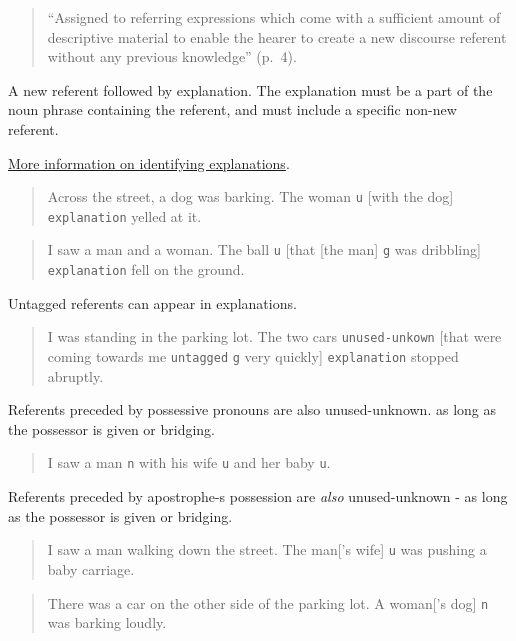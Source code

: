 \documentclass[
]{book}
\begin{document}
\begin{quote}
``Assigned to referring expressions which come with a sufficient amount of descriptive material to enable the hearer to create a new discourse referent without any previous knowledge'' (p.~4).
\end{quote}

A new referent followed by explanation.
The explanation must be a part of the noun phrase containing the referent, and must include a specific non-new referent.

\protect\hyperlink{referent-explanations}{More information on identifying explanations}.

\begin{quote}
Across the street, a dog was barking.
The woman \texttt{u} {[}with the dog{]} \texttt{explanation} yelled at it.
\end{quote}

\begin{quote}
I saw a man and a woman.
The ball \texttt{u} {[}that {[}the man{]} \texttt{g} was dribbling{]} \texttt{explanation} fell on the ground.
\end{quote}

Untagged referents can appear in explanations.

\begin{quote}
I was standing in the parking lot.
The two cars \texttt{unused-unkown} {[}that were coming towards me \texttt{untagged} \texttt{g} very quickly{]} \texttt{explanation} stopped abruptly.
\end{quote}

Referents preceded by possessive pronouns are also unused-unknown.
as long as the possessor is given or bridging.

\begin{quote}
I saw a man \texttt{n} with his wife \texttt{u} and her baby \texttt{u}.
\end{quote}

Referents preceded by apostrophe-s possession are \emph{also} unused-unknown -
as long as the possessor is given or bridging.

\begin{quote}
I saw a man walking down the street.
The man{[}'s wife{]} \texttt{u} was pushing a baby carriage.
\end{quote}

\begin{quote}
There was a car on the other side of the parking lot.
A woman{[}'s dog{]} \texttt{n} was barking loudly.
\end{quote}
\end{document}

